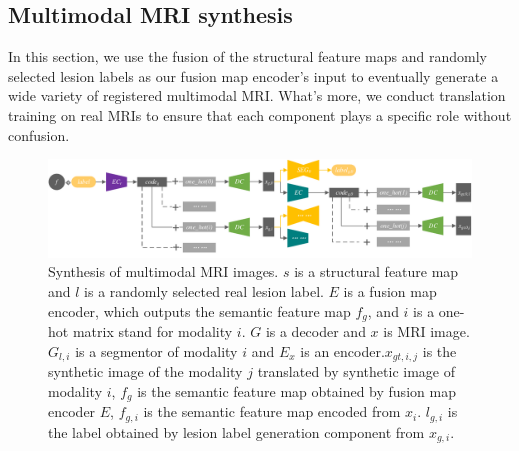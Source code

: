 \documentclass[runningheads]{llncs}
\begin{document}
\subsection{Multimodal MRI synthesis}
In this section, we use the fusion of the structural feature maps and randomly selected lesion labels as our fusion map encoder's input to eventually generate a wide variety of registered multimodal MRI. What's more, we conduct translation training on real MRIs to ensure that each component plays a specific role without confusion.
\begin{figure}
	\centering
	\includegraphics[width=1\columnwidth]{figures/mm_mri_generate}
	\caption{Synthesis of multimodal MRI images.
		$s$ is a structural feature map and $l$ is a randomly selected real lesion label. $E$ is a fusion map encoder, which outputs the semantic feature map $f_g$, and  $i$ is a one-hot matrix stand for modality $i$. $G$ is a decoder and $x$ is MRI image. $G_{l,i}$ is a segmentor of modality $i$ and $E_x$ is an encoder.$x_{gt,i,j}$ is the synthetic image of the modality $j$ translated by synthetic image of modality $i$, $f_g$ is the semantic feature map obtained by fusion map encoder $E$, $f_{g,i}$ is the semantic feature map encoded from $x_i$. $l_{g,i}$ is the label obtained by lesion label generation component from $x_{g,i}$.
	}
	\label{mm_mri_generate}
\end{figure}
\end{document}
